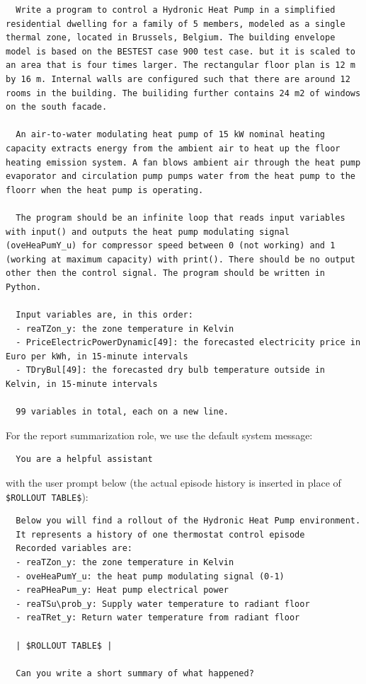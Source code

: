 \begin{lstlisting}
  Write a program to control a Hydronic Heat Pump in a simplified residential dwelling for a family of 5 members, modeled as a single thermal zone, located in Brussels, Belgium. The building envelope model is based on the BESTEST case 900 test case. but it is scaled to an area that is four times larger. The rectangular floor plan is 12 m by 16 m. Internal walls are configured such that there are around 12 rooms in the building. The builiding further contains 24 m2 of windows on the south facade.

  An air-to-water modulating heat pump of 15 kW nominal heating capacity extracts energy from the ambient air to heat up the floor heating emission system. A fan blows ambient air through the heat pump evaporator and circulation pump pumps water from the heat pump to the floorr when the heat pump is operating. 
  
  The program should be an infinite loop that reads input variables with input() and outputs the heat pump modulating signal (oveHeaPumY_u) for compressor speed between 0 (not working) and 1 (working at maximum capacity) with print(). There should be no output other then the control signal. The program should be written in Python.
  
  Input variables are, in this order:
  - reaTZon_y: the zone temperature in Kelvin
  - PriceElectricPowerDynamic[49]: the forecasted electricity price in Euro per kWh, in 15-minute intervals
  - TDryBul[49]: the forecasted dry bulb temperature outside in Kelvin, in 15-minute intervals

  99 variables in total, each on a new line.
\end{lstlisting}

For the report summarization role, we use the default system message:

\begin{lstlisting}
  You are a helpful assistant
\end{lstlisting}

with the user prompt below (the actual episode history is inserted in place of \verb|$ROLLOUT TABLE$|):

\begin{lstlisting}
  Below you will find a rollout of the Hydronic Heat Pump environment.
  It represents a history of one thermostat control episode
  Recorded variables are:
  - reaTZon_y: the zone temperature in Kelvin
  - oveHeaPumY_u: the heat pump modulating signal (0-1)
  - reaPHeaPum_y: Heat pump electrical power
  - reaTSu\prob_y: Supply water temperature to radiant floor
  - reaTRet_y: Return water temperature from radiant floor

  | $ROLLOUT TABLE$ |

  Can you write a short summary of what happened?
\end{lstlisting}

